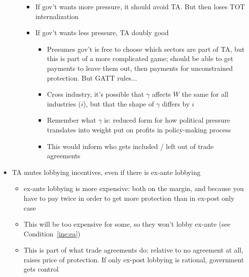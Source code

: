 \documentclass[12pt]{article}
\newcommand{\ga}{\gamma}
\begin{document}
\begin{itemize}
\begin{itemize}
\begin{itemize}
					\item If gov't wants more pressure, it should avoid TA. But then loses TOT internalization
					\item If gov't wants less pressure, TA doubly good
						\begin{itemize}
							\item Presumes gov't is free to choose which sectors are part of TA, but this is part of a more complicated game; should be able to get payments to leave them out, then payments for unconstrained protection. But GATT rules...
							\item Cross industry, it's possible that $\ga$ affects $W$ the same for all industries ($i$), but that the shape of $\ga$ differs by $i$
							\item Remember what $\ga$ is: reduced form for how political pressure translates into weight put on profits in policy-making process
							\item This would inform who gets included / left out of trade agreements
						\end{itemize}
					\end{itemize}
		\end{itemize}
	\item TA mutes lobbying incentives, even if there is ex-ante lobbying
		\begin{itemize}
			\item ex-ante lobbying is more expensive: both on the margin, and because you have to pay twice in order to get more protection than in ex-post only case
			\item This will be too expensive for some, so they won't lobby ex-ante (see Condition~\ref{ine:ea})
			\item This is part of what trade agreements do: relative to no agreement at all, raises price of protection. If only ex-post lobbying is rational, government gets control
		\end{itemize}


\end{itemize}
\end{document}
